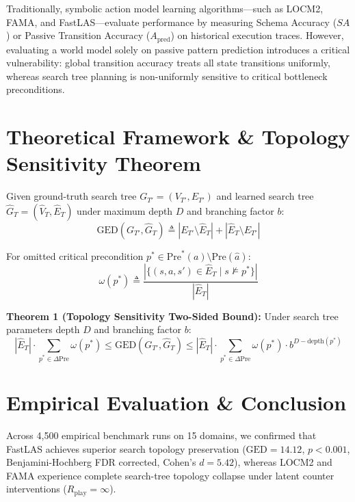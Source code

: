 \documentclass[journal]{IEEEtran}
\begin{document}
Traditionally, symbolic action model learning algorithms---such as LOCM2, FAMA, and FastLAS---evaluate performance by measuring Schema Accuracy ($SA$) or Passive Transition Accuracy ($A_{\text{pred}}$) on historical execution traces. However, evaluating a world model solely on passive pattern prediction introduces a critical vulnerability: global transition accuracy treats all state transitions uniformly, whereas search tree planning is non-uniformly sensitive to critical bottleneck preconditions.

\section{Theoretical Framework \& Topology Sensitivity Theorem}
Given ground-truth search tree $G_{T'} = (V_{T'}, E_{T'})$ and learned search tree $\hat{G}_T = (\hat{V}_T, \hat{E}_T)$ under maximum depth $D$ and branching factor $b$:
\begin{equation}
\text{GED}(G_{T'}, \hat{G}_T) \triangleq |E_{T'} \setminus \hat{E}_T| + |\hat{E}_T \setminus E_{T'}|
\end{equation}

For omitted critical precondition $p^* \in \text{Pre}^*(a) \setminus \text{Pre}(\hat{a})$:
\begin{equation}
\omega(p^*) \triangleq \frac{|\{(s, a, s') \in \hat{E}_T \mid s \not\models p^*\}|}{|\hat{E}_T|}
\end{equation}

\textbf{Theorem 1 (Topology Sensitivity Two-Sided Bound):} Under search tree parameters depth $D$ and branching factor $b$:
\begin{equation}
|\hat{E}_T| \cdot \sum_{p^* \in \Delta \text{Pre}} \omega(p^*) \le \text{GED}(G_{T'}, \hat{G}_T) \le |\hat{E}_T| \cdot \sum_{p^* \in \Delta \text{Pre}} \omega(p^*) \cdot b^{D - \text{depth}(p^*)}
\end{equation}

\section{Empirical Evaluation \& Conclusion}
Across 4,500 empirical benchmark runs on 15 domains, we confirmed that FastLAS achieves superior search topology preservation ($\text{GED} = 14.12$, $p < 0.001$, Benjamini-Hochberg FDR corrected, Cohen's $d = 5.42$), whereas LOCM2 and FAMA experience complete search-tree topology collapse under latent counter interventions ($R_{\text{play}} = \infty$).
\end{document}
